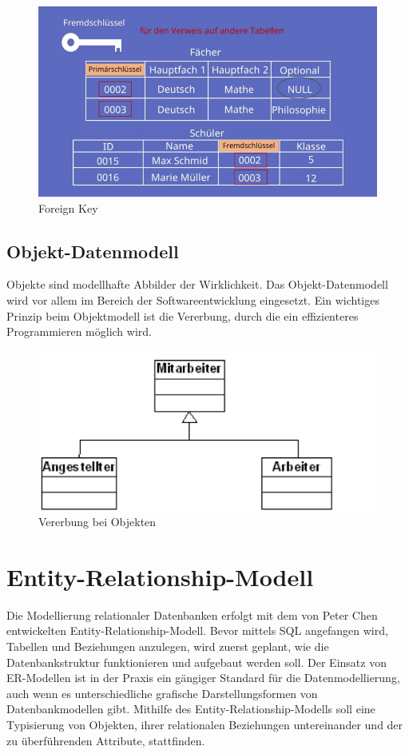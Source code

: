 \begin{figure}[H]
    \centering
    \includegraphics[width=.8\textwidth]{Content/images/modellierung/foreignkey.png}
    \caption{Foreign Key}
    \label{fig:modellierung:foreignkey}
\end{figure}

\subsection{Objekt-Datenmodell}

Objekte sind modellhafte Abbilder der Wirklichkeit. Das Objekt-Datenmodell wird vor allem im Bereich der Softwareentwicklung eingesetzt. Ein wichtiges Prinzip beim Objektmodell ist die Vererbung, durch die ein effizienteres Programmieren möglich wird.

\begin{figure}[H]
    \centering
    \includegraphics[width=.8\textwidth]{Content/images/modellierung/objekt.png}
    \caption{Vererbung bei Objekten}
    \label{fig:modellierung:objekt}
\end{figure}

\section{Entity-Relationship-Modell}

Die Modellierung relationaler Datenbanken erfolgt mit dem von Peter Chen entwickelten Entity-Relationship-Modell. Bevor mittels SQL angefangen wird, Tabellen und Beziehungen anzulegen, wird zuerst geplant, wie die Datenbankstruktur funktionieren und aufgebaut werden soll. Der Einsatz von ER-Modellen ist in der Praxis ein gängiger Standard für die Datenmodellierung, auch wenn es unterschiedliche grafische Darstellungsformen von Datenbankmodellen gibt.
Mithilfe des Entity-Relationship-Modells soll eine Typisierung von Objekten, ihrer relationalen Beziehungen untereinander und der zu überführenden Attribute, stattfinden.


